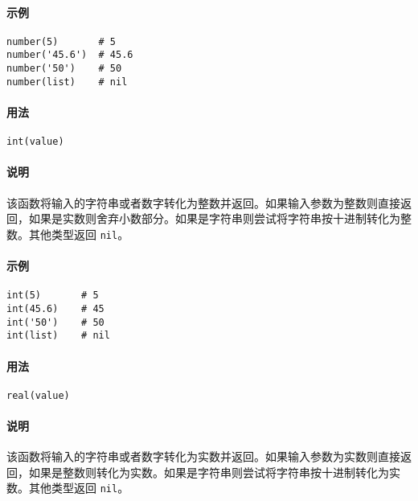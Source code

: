 \paragraph{示例}
\begin{lstlisting}[language=berry, numbers=none]
number(5)       # 5
number('45.6')  # 45.6
number('50')    # 50
number(list)    # nil
\end{lstlisting}


\paragraph{用法}
\begin{lstlisting}[language=berry, numbers=none]
int(value)
\end{lstlisting}

\paragraph{说明}
该函数将输入的字符串或者数字转化为整数并返回。如果输入参数为整数则直接返回，如果是实数则舍弃小数部分。如果是字符串则尝试将字符串按十进制转化为整数。其他类型返回 \texttt{nil}。

\paragraph{示例}
\begin{lstlisting}[language=berry, numbers=none]
int(5)       # 5
int(45.6)    # 45
int('50')    # 50
int(list)    # nil
\end{lstlisting}


\paragraph{用法}
\begin{lstlisting}[language=berry, numbers=none]
real(value)
\end{lstlisting}

\paragraph{说明}
该函数将输入的字符串或者数字转化为实数并返回。如果输入参数为实数则直接返回，如果是整数则转化为实数。如果是字符串则尝试将字符串按十进制转化为实数。其他类型返回 \texttt{nil}。

